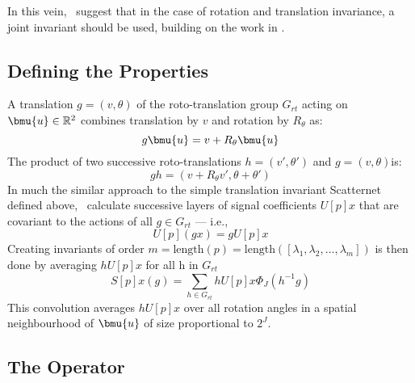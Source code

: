   In this vein, \Bruna\ suggest that in the case of rotation and translation
  invariance, a joint invariant should be used, building on the work in
  \citep{citti_cortical_2006, boscain_anthropomorphic_2010,
  sgallari_scale_2007}. 


\subsection{Defining the Properties}
  A translation $g = (v, \theta)$ of the roto-translation group $G_{rt}$ acting on
  $\bmu{u} \in \mathbb{R}^2$ combines translation by $v$ and rotation by
  $R_{\theta}$ as:
  \begin{equation}
    g\bmu{u} = v + R_{\theta}\bmu{u}
  \end{equation}
  The product of two successive roto-translations $h=(v',
  \theta ')$ and $g = (v, \theta) $is:
  \begin{equation}
    gh = (v + R_{\theta}v', \theta + \theta')
  \end{equation}
  In much the similar approach to the simple translation invariant Scatternet defined
  above, \Bruna\ calculate successive layers of signal coefficients $U[p]x$ that
  are covariant to the actions of all $g \in G_{rt}$ --- i.e.,\ 
  \begin{equation}
    U[p](gx) = gU[p]x
  \end{equation}
  Creating invariants of order $m = \mathrm{length}(p)
  = \mathrm{length}([\lambda_1, \lambda_2, \ldots, \lambda_m])$ is then done by
  averaging $hU[p]x$ for all h in $G_{rt}$
  \begin{equation}
    S[p]x(g) = \sum_{h \in G_{rt}} hU[p]x \Phi_J(h^{-1}g)
  \end{equation}
  This convolution averages $hU[p]x$ over all rotation angles in a spatial
  neighbourhood of $\bmu{u}$ of size proportional to $2^J$.

\subsection{The Operator}
